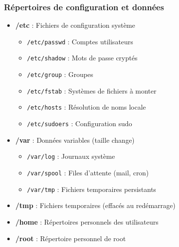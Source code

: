 \documentclass[12pt,a4paper]{article}
\begin{document}
\subsubsection{Répertoires de configuration et données}
\begin{itemize}
    \item \textbf{/etc} : Fichiers de configuration système
    \begin{itemize}
        \item \texttt{/etc/passwd} : Comptes utilisateurs
        \item \texttt{/etc/shadow} : Mots de passe cryptés
        \item \texttt{/etc/group} : Groupes
        \item \texttt{/etc/fstab} : Systèmes de fichiers à monter
        \item \texttt{/etc/hosts} : Résolution de noms locale
        \item \texttt{/etc/sudoers} : Configuration sudo
    \end{itemize}
    \item \textbf{/var} : Données variables (taille change)
    \begin{itemize}
        \item \texttt{/var/log} : Journaux système
        \item \texttt{/var/spool} : Files d'attente (mail, cron)
        \item \texttt{/var/tmp} : Fichiers temporaires persistants
    \end{itemize}
    \item \textbf{/tmp} : Fichiers temporaires (effacés au redémarrage)
    \item \textbf{/home} : Répertoires personnels des utilisateurs
    \item \textbf{/root} : Répertoire personnel de root
\end{itemize}
\end{document}
